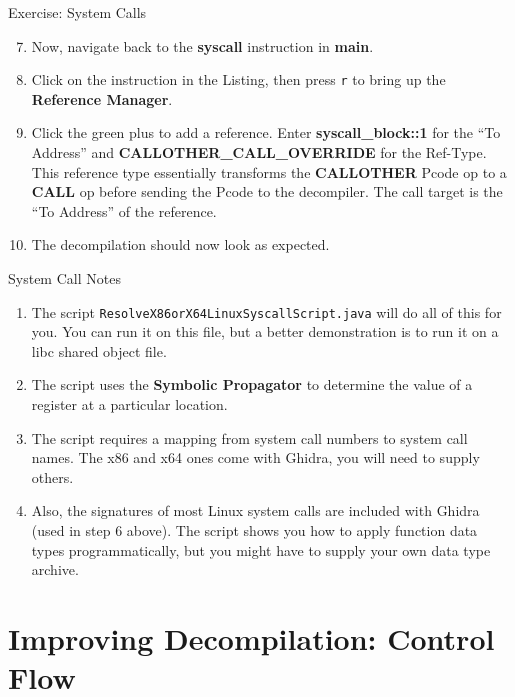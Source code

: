 \documentclass{beamer}
\begin{document}
\begin{frame}
\begin{block}{Exercise: System Calls}
\begin{enumerate}
\setcounter{enumi}{6}
\item Now, navigate back to the \textbf{syscall} instruction in \textbf{main}. 
\item Click on the instruction in the Listing, then press \texttt{r} to bring up the \textbf{Reference Manager}.
\item Click the green plus to add a reference.  Enter \textbf{syscall\_block::1} for the ``To Address'' and \textbf{CALLOTHER\_CALL\_OVERRIDE} for the Ref-Type.
This reference type essentially transforms the \textbf{CALLOTHER} Pcode op to a \textbf{CALL} op before sending the Pcode to the decompiler.  The call target is the ``To Address''
of the reference.
\item[] The decompilation should now look as expected.
\end{enumerate}
\end{block}
\end{frame}

\begin{frame}
\begin{block}{System Call Notes}
\begin{enumerate}
\item The script \texttt{ResolveX86orX64LinuxSyscallScript.java} will do all of this for you. You can run it on this file, but a better demonstration is to run it on a 
libc shared object file.
\item The script uses the \textbf{Symbolic Propagator} to determine the value of a register at a particular location.
\item The script requires a mapping from system call numbers to system call names.  The x86 and x64 ones come with Ghidra, you will need to supply others.
\item Also, the signatures of most Linux system calls are included with Ghidra (used in step 6 above).  The script shows you how to apply function data types programmatically,
but you might have to supply your own data type archive.
\end{enumerate}
\end{block}
\end{frame}


\section{Improving Decompilation: Control Flow}
\end{document}
